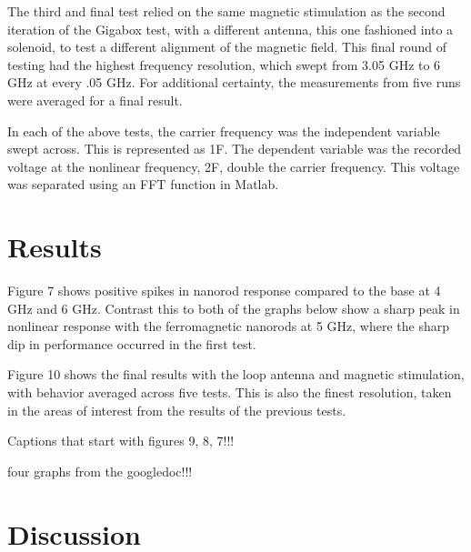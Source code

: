 The third and final test relied on the same magnetic stimulation as the second iteration of the Gigabox test, with a different antenna, this one fashioned into a solenoid, to test a different alignment of the magnetic field. This final round of testing had the highest frequency resolution, which swept from 3.05 GHz to 6 GHz at every .05 GHz. For additional certainty, the measurements from five runs were averaged for a final result.

In each of the above tests, the carrier frequency was the independent variable swept across. This is represented as 1F. The dependent variable was the recorded voltage at the nonlinear frequency, 2F, double the carrier frequency. This voltage was separated using an FFT function in Matlab.

\section{Results}
\label{sec:nanorod-results}

Figure 7 shows positive spikes in nanorod response compared to the base at 4 GHz and 6 GHz. Contrast this to both of the graphs below show a sharp peak in nonlinear response with the ferromagnetic nanorods at 5 GHz, where the sharp dip in performance occurred in the first test.

Figure 10 shows the final results with the loop antenna and magnetic stimulation, with behavior averaged across five tests. This is also the finest resolution, taken in the areas of interest from the results of the previous tests.

{Captions that start with figures 9, 8, 7!!!}

{four graphs from the googledoc!!!}


\section{Discussion}
\label{sec:nanorod-discussion}

